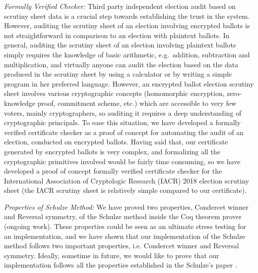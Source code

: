 \noindent 
\textit{Formally Verified Checker:} Third party independent election audit based on scrutiny sheet data is a crucial step towards 
establishing the trust in the system.   However, auditing the scrutiny sheet of an election involving encrypted ballots
is not straightforward in comparison to an election with plaintext ballots. 
In general, auditing the scrutiny sheet of an election involving 
plaintext ballots simply requires the knowledge of basic arithmetic, e.g.~addition, subtraction and multiplication, 
and virtually anyone can audit the election based on the data produced in the scrutiny sheet by
using a calculator or by writing a simple program in her preferred language. 
However, an encrypted ballot election scrutiny sheet involves various
cryptographic concepts (homomorphic encryption, zero-knowledge proof, commitment scheme, etc.) 
which are accessible to very few voters, mainly cryptographers,  so auditing it 
requires a deep understanding of cryptographic principals. To ease this situation, we have developed a formally verified 
certificate checker as a proof of concept for automating the audit of an election, conducted on encrypted ballots. 
Having said that,  our certificate generated by encrypted ballots is very complex, and formalizing all the cryptographic 
primitives involved would be fairly time consuming, so we have developed a proof of concept 
formally verified certificate checker for the International Association of Cryptologic Research (IACR) 2018 election
scrutiny sheet (the IACR scrutiny sheet is relatively simple compared to our certificate).

\noindent
\textit{Properties of Schulze Method:} We have proved two properties, Condercet winner and Reversal symmetry, 
of the Schulze method inside the Coq theorem prover (ongoing work).  These properties could be seen as an 
ultimate stress testing for an implementation, and we have shown that our implementation of the Schulze 
method follows two important properties,  i.e.  Condercet winner and Reversal symmetry.  Ideally,  sometime in 
future,  we would like to prove that our implementation follows all the properties established in the Schulze's 
paper  \citep{Schulze:2011:NMC}. 


